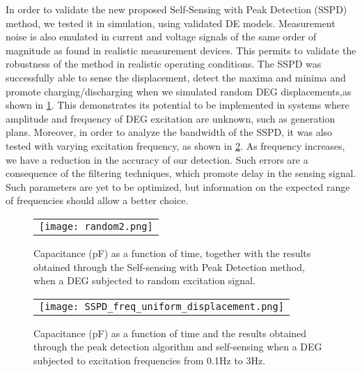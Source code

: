 In order to validate the new proposed Self-Sensing with Peak Detection (SSPD) method, we tested it in simulation, using validated DE models\cite{RN702}. Measurement noise is also emulated in current and voltage signals of the same order of magnitude as found in realistic measurement devices. This permits to validate the robustness of the method in realistic operating conditions. The SSPD was successfully able to sense the displacement, detect the maxima and minima and promote charging/discharging when we simulated random DEG displacements,as shown in \cref{fig:random}. This demonstrates its potential to be implemented in systems where amplitude and frequency of DEG excitation are unknown, such as generation plans\cite{RN21,RN210,RN164}. Moreover, in order to analyze the bandwidth of the SSPD, it was also tested with varying excitation frequency, as shown in \cref{fig:sweep}. As frequency increases, we have a reduction in the accuracy of our detection. Such errors are a consequence of the filtering techniques, which promote delay in the sensing signal. Such parameters are yet to be optimized, but information on the expected range of frequencies should allow a better choice.

\begin{figure} [ht]
   \begin{center}
   \begin{tabular}{c} %
   \texttt{[image: random2.png]}
   \end{tabular}
   \end{center}
   \caption[example] 
   { \label{fig:random} 
Capacitance (pF) as a function of time, together with the results obtained through the  Self-sensing with Peak Detection method, when a DEG subjected to random excitation signal.}   \end{figure} 
   
   \begin{figure} [ht]
   \begin{center}
   \begin{tabular}{c} %
   \texttt{[image: SSPD\_freq\_uniform\_displacement.png]}
   \end{tabular}
   \end{center}
   \caption[example] 
   { \label{fig:sweep} 
Capacitance (pF) as a function of time and the results obtained through the peak detection algorithm and self-sensing when a DEG subjected to excitation frequencies from 0.1Hz to 3Hz.}
   \end{figure}


